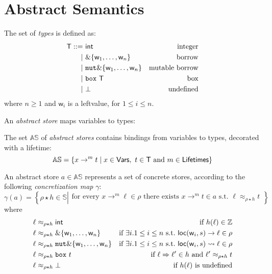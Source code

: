 \section{Abstract Semantics}\label{sec:abstract_semantics}

\begin{definition}[Types]
  The set of \emph{types} is defined as:
  \begin{align*}
    \mathsf{T} ::=&\ \mathsf{int} & \text{integer}\\
    | &\ \&\{\mathsf{w}_1,\ldots,\mathsf{w}_n\} & \text{borrow}\\
    | &\ \mathtt{mut}\&\{\mathsf{w}_1,\ldots,\mathsf{w}_n\} & \text{mutable borrow}\\
    | &\ \mathtt{box}\ \mathsf{T} & \text{box}\\
    | &\ \bot & \text{undefined}
  \end{align*}
  where $n\ge 1$ and $\mathsf{w}_i$ is a leftvalue, for $1\le i\le n$.
\end{definition}

An \emph{abstract store} maps variables to types:

\begin{definition}
  The set $\mathbb{AS}$ of \emph{abstract stores} contains bindings
  from variables to types, decorated with a lifetime:
  \[
  \mathbb{AS}=\{x\to^m t\mid x\in\Vars,\ t\in\mathsf{T}\text{ and }m\in\Lifetimes\}
  \]
\end{definition}

\begin{definition}
  An abstract store $a\in\mathbb{AS}$ represents a set of concrete stores, according
  to the following \emph{concretization map} $\gamma$:
  \[
  \gamma(a)=\left\{\rho\star h\in\mathbb{S}\left|\begin{array}{l}
  \text{for every }x\to^m\ell\in\rho\text{ there exists }x\to^m t\in a\text{ s.t. }\ell\approx_{\rho\star h}t
  \end{array}
  \right.\right\}
  \]
  where
  \begin{align*}
    \ell&\approx_{\rho\star h}\mathsf{int} & \text{if $h(\ell)\in\mathbb{Z}$}\\
    \ell&\approx_{\rho\star h}\&\{\mathsf{w}_1,\ldots,\mathsf{w}_n\} & \text{if $\exists i.1\le i\le n$ s.t.\ }\mathsf{loc}(\mathsf{w}_i,s)\to\ell\in\rho\\
    \ell&\approx_{\rho\star h}\mathtt{mut}\&\{\mathsf{w}_1,\ldots,\mathsf{w}_n\} & \text{if $\exists i.1\le i\le n$ s.t.\ }\mathsf{loc}(\mathsf{w}_i,s)\leadsto\ell\in\rho\\
    \ell&\approx_{\rho\star h}\mathtt{box}\ t & \text{if $\ell\Rightarrow\ell'\in h$ and $\ell'\approx_{\rho\star h}t$}\\
    \ell&\approx_{\rho\star h}\bot & \text{if $h(\ell)$ is undefined}
  \end{align*}
\end{definition}
